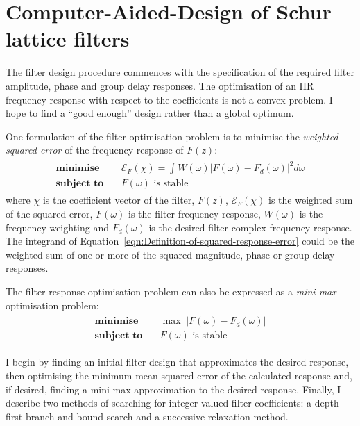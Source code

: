 \documentclass[a4paper,twoside,10pt,english]{article}
\begin{document}
\section{Computer-Aided-Design of Schur lattice filters}
The filter design procedure commences with the specification of the required
filter amplitude, phase and group delay responses. The optimisation of an IIR
frequency response with respect to the coefficients is not a convex problem. I
hope to find a ``good enough'' design rather than a global optimum.

One formulation of the filter optimisation problem is to minimise the
\emph{weighted squared error} of the frequency response of $F\left(z\right)$:
\begin{align}
\begin{split}
  \textbf{minimise}\quad &\mathcal{E}_{F}\left(\chi\right) =
  \int W\left(\omega\right)\left|F\left(\omega\right)
    -F_{d}\left(\omega\right)\right|^{2}d\omega \\
\textbf{subject to}\quad &F\left(\omega\right)\text{ is stable} 
\end{split}
\label{eqn:Definition-of-squared-response-error}
\end{align}
where $\chi$ is the coefficient vector of the filter, $F\left(z\right)$,
$\mathcal{E}_{F}\left(\chi\right)$ is the weighted sum of the squared error,
$F\left(\omega\right)$ is the filter frequency response,
$W\left(\omega\right)$ is the frequency weighting and
$F_{d}\left(\omega\right)$ is the desired filter complex frequency response.
The integrand of Equation~\ref{eqn:Definition-of-squared-response-error} could
be the weighted sum of one or more of the squared-magnitude, phase or group
delay responses.

The filter response optimisation problem can also be expressed as a
\emph{mini-max} optimisation problem:
\begin{align}
\label{eqn:Definition-of-minimax-response-error}
\begin{split}
\textbf{minimise}\quad &\max\;\left|F\left(\omega\right)
  -F_{d}\left(\omega\right)\right|\\
\textbf{subject to}\quad &F\left(\omega\right)\text{ is stable} 
\end{split}
\end{align}

I begin by finding an initial filter design that approximates the desired
response, then optimising the minimum mean-squared-error of the
calculated response and, if desired, finding a mini-max approximation to
the desired response. Finally, I describe two methods of
searching for integer valued filter coefficients: a depth-first branch-and-bound
search and a successive relaxation method.
\end{document}
